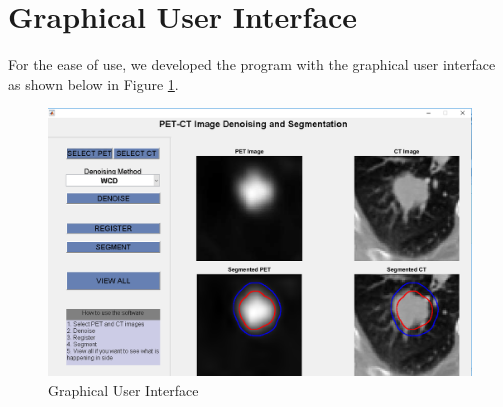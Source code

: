 \section{Graphical User Interface}

For the ease of use, we developed the program with the graphical user interface as shown below in Figure \ref{fig:gui}.


\begin{figure}[h]
	\centering
	\includegraphics[width=\textwidth]{fig/gui.PNG}
	\caption{Graphical User Interface}
	\label{fig:gui}
\end{figure}